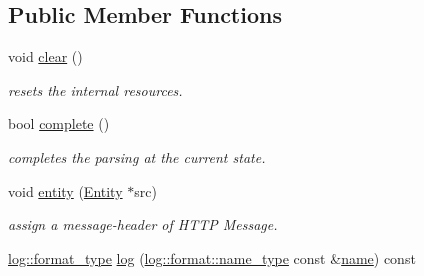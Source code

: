 \subsection*{Public Member Functions}
\begin{DoxyCompactItemize}
\item 
\hypertarget{classhryky_1_1http_1_1header_1_1content_1_1_reader_a8ec241a8d4610944210c13ed66110ab3}{void \hyperlink{classhryky_1_1http_1_1header_1_1content_1_1_reader_a8ec241a8d4610944210c13ed66110ab3}{clear} ()}\label{classhryky_1_1http_1_1header_1_1content_1_1_reader_a8ec241a8d4610944210c13ed66110ab3}

\begin{DoxyCompactList}\small\item\em resets the internal resources. \end{DoxyCompactList}\item 
\hypertarget{classhryky_1_1http_1_1header_1_1content_1_1_reader_ae5ea5f5a574fe5ab776363b43704062b}{bool \hyperlink{classhryky_1_1http_1_1header_1_1content_1_1_reader_ae5ea5f5a574fe5ab776363b43704062b}{complete} ()}\label{classhryky_1_1http_1_1header_1_1content_1_1_reader_ae5ea5f5a574fe5ab776363b43704062b}

\begin{DoxyCompactList}\small\item\em completes the parsing at the current state. \end{DoxyCompactList}\item 
\hypertarget{classhryky_1_1http_1_1header_1_1content_1_1_reader_aafc2c835d30d13049517e7638820f51f}{void \hyperlink{classhryky_1_1http_1_1header_1_1content_1_1_reader_aafc2c835d30d13049517e7638820f51f}{entity} (\hyperlink{classhryky_1_1http_1_1header_1_1_entity}{Entity} $\ast$src)}\label{classhryky_1_1http_1_1header_1_1content_1_1_reader_aafc2c835d30d13049517e7638820f51f}

\begin{DoxyCompactList}\small\item\em assign a message-\/header of H\-T\-T\-P Message. \end{DoxyCompactList}\item 
\hypertarget{classhryky_1_1http_1_1header_1_1content_1_1_reader_a768aa696498234de984a0081c9931d4f}{\hyperlink{namespacehryky_1_1log_ad50448c3f934f1eacd5c1bcffe8111e1}{log\-::format\-\_\-type} \hyperlink{classhryky_1_1http_1_1header_1_1content_1_1_reader_a768aa696498234de984a0081c9931d4f}{log} (\hyperlink{namespacehryky_1_1log_1_1format_ab7408d1e2ed2d648dbf9bba69eb74288}{log\-::format\-::name\-\_\-type} const \&\hyperlink{classhryky_1_1http_1_1header_1_1content_1_1_reader_a0355571881f123c3dc3105909b4d4dd7}{name}) const }\label{classhryky_1_1http_1_1header_1_1content_1_1_reader_a768aa696498234de984a0081c9931d4f}


\end{DoxyCompactItemize}
